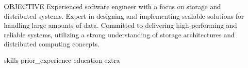 \documentclass{resume}
\begin{document}

\begin{rSection}{OBJECTIVE}
{Experienced software engineer with a focus on storage and distributed systems. Expert in designing and implementing scalable solutions for handling large amounts of data. Committed to delivering high-performing and reliable systems, utilizing a strong understanding of storage architectures and distributed computing concepts.}
\end{rSection}


{skills}
{prior_experience}
\newpage
{education}
{extra}
\end{document}
